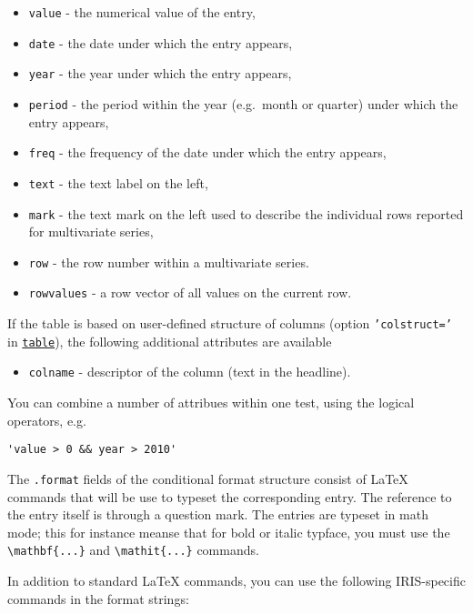 \begin{itemize}
\itemsep1pt\parskip0pt
\item
  \texttt{value} - the numerical value of the entry,
\item
  \texttt{date} - the date under which the entry appears,
\item
  \texttt{year} - the year under which the entry appears,
\item
  \texttt{period} - the period within the year (e.g.~month or quarter)
  under which the entry appears,
\item
  \texttt{freq} - the frequency of the date under which the entry
  appears,
\item
  \texttt{text} - the text label on the left,
\item
  \texttt{mark} - the text mark on the left used to describe the
  individual rows reported for multivariate series,
\item
  \texttt{row} - the row number within a multivariate series.
\item
  \texttt{rowvalues} - a row vector of all values on the current row.
\end{itemize}

If the table is based on user-defined structure of columns (option
\texttt{'colstruct='} in \href{report/table}{\texttt{table}}), the
following additional attributes are available

\begin{itemize}
\itemsep1pt\parskip0pt
\item
  \texttt{colname} - descriptor of the column (text in the headline).
\end{itemize}

You can combine a number of attribues within one test, using the logical
operators, e.g.

\begin{verbatim}
'value > 0 && year > 2010'
\end{verbatim}

The \texttt{.format} fields of the conditional format structure consist
of LaTeX commands that will be use to typeset the corresponding entry.
The reference to the entry itself is through a question mark. The
entries are typeset in math mode; this for instance meanse that for bold
or italic typface, you must use the
\texttt{\textbackslash{}mathbf\{...\}} and
\texttt{\textbackslash{}mathit\{...\}} commands.

In addition to standard LaTeX commands, you can use the following
IRIS-specific commands in the format strings:

